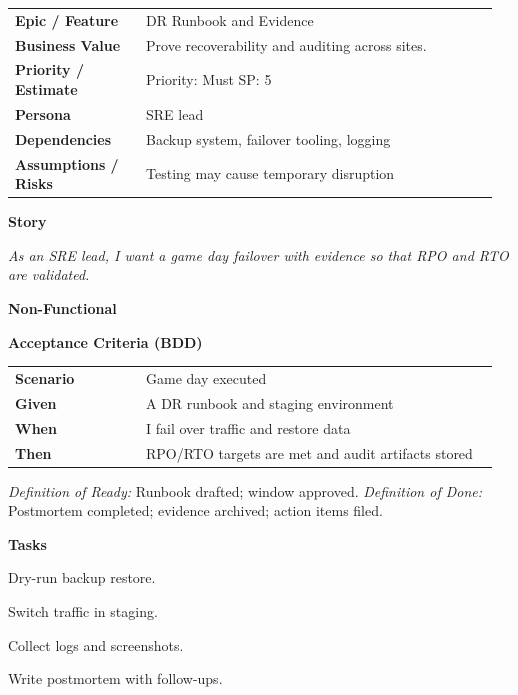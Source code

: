 \documentclass[11pt,letterpaper]{article}
\makeatletter
\newenvironment{kvtable}{%
  \par\noindent\begin{tabular}{@{}>{\raggedright\bfseries\arraybackslash}p{0.26\linewidth} >{\raggedright\arraybackslash}p{0.70\linewidth}@{}}
}{\end{tabular}\par}
\newenvironment{bdd}{%
  \par\noindent\begin{tabular}{@{}>{\raggedright\bfseries\arraybackslash}p{0.26\linewidth} >{\raggedright\arraybackslash}p{0.70\linewidth}@{}}
}{\end{tabular}\par}
\newcommand{\DoRDoD}[2]{%
  \vspace{0.35em}
  {\footnotesize\color{Muted}%
    \textit{Definition of Ready:} #1 \; \textbullet\;
    \textit{Definition of Done:} #2%
  }%
}
\newenvironment{storycard}[2]{%
  \begin{tcolorbox}[cloudcard, title={#1 --- #2}]%
}{\end{tcolorbox}}
\newcommand{\sectionlabel}[1]{\par\vspace{0.35em}\textbf{#1}\par}
\makeatother
\begin{document}
\begin{storycard}{CCS-30}{Ch. 30 — Availability, Recovery, \& Auditing}
\begin{kvtable}
Epic / Feature & DR Runbook and Evidence\\
Business Value & Prove recoverability and auditing across sites.\\
Priority / Estimate & Priority: Must \quad SP: 5\\
Persona & SRE lead\\
Dependencies & Backup system, failover tooling, logging\\
Assumptions / Risks & Testing may cause temporary disruption\\
\end{kvtable}
\sectionlabel{Story}
\textit{As an SRE lead, I want a game day failover with evidence so that RPO and RTO are validated.}
\sectionlabel{Non-Functional}\;
\sectionlabel{Acceptance Criteria (BDD)}
\begin{bdd}
Scenario & Game day executed\\
Given & A DR runbook and staging environment\\
When & I fail over traffic and restore data\\
Then & RPO/RTO targets are met and audit artifacts stored\\
\end{bdd}
\DoRDoD{Runbook drafted; window approved.}{Postmortem completed; evidence archived; action items filed.}
\sectionlabel{Tasks}
\begin{checklist}
\item Dry-run backup restore.
\item Switch traffic in staging.
\item Collect logs and screenshots.
\item Write postmortem with follow-ups.
\end{checklist}
\end{storycard}
\end{document}
